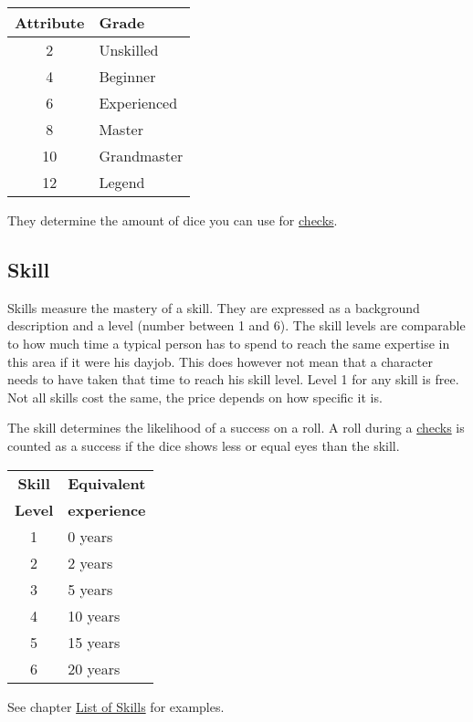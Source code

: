 \documentclass[11pt]{article}
\begin{document}
{\begin{multicols}{2}[]
\begin{center}
\begin{tabular}{c|l}
\textbf{Attribute} & \textbf{Grade}\\
\hline
2 & Unskilled\\
4 & Beginner\\
6 & Experienced\\
8 & Master\\
10 & Grandmaster\\
12 & Legend\\
\end{tabular}
\end{center}

They determine the amount of dice you can use for \hyperref[sec:orga6ddd85]{checks}. 

\subsection{Skill}
\label{sec:org3717ac6}

Skills measure the mastery of a skill. They are expressed as a background description and a level (number between 1 and 6). The skill levels are comparable to how much time a typical person has to spend to reach the same expertise in this area if it were his dayjob. This does however not mean that a character needs to have taken that time to reach his skill level. Level 1 for any skill is free. Not all skills cost the same, the price depends on how specific it is.

The skill determines the likelihood of a success on a roll. A roll during a \hyperref[sec:orga6ddd85]{checks} is counted as a success if the dice shows less or equal eyes than the skill.


\begin{center}
\begin{tabular}{c|l}
\textbf{Skill} & \textbf{Equivalent}\\
\textbf{Level} & \textbf{experience}\\
\hline
1 & 0 years\\
2 & 2 years\\
3 & 5 years\\
4 & 10 years\\
5 & 15 years\\
6 & 20 years\\
\end{tabular}
\end{center}

See chapter \hyperref[sec:orgd36bb2b]{List of Skills} for examples.


\end{multicols}}
\end{document}
